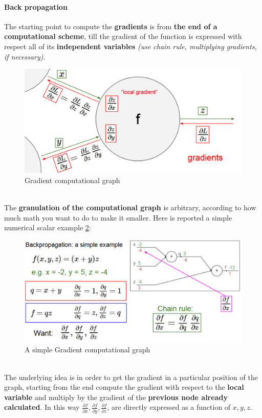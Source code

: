 \documentclass[11pt]{article}
\begin{document}
\paragraph{Back propagation}
The  starting point to compute the \textbf{gradients} is from \textbf{the end of a computational scheme},  till the gradient of the function is expressed with respect  all of its \textbf{independent variables} \textit{(use chain rule, multiplying gradients, if necessary)}.\\
\begin{figure}[h]
\centering
\captionsetup{justification=centering}
\includegraphics[width=0.7\linewidth]{L310.pdf}
\caption{ Gradient computational graph}
\label{fig:L310}
\end{figure}\\
The \textbf{granulation of the computational graph} is arbitrary, according to how much math you want to do to make it smaller. Here is reported a simple numerical scalar  example \ref{fig:L311}:
\begin{figure}[h]
\centering
\captionsetup{justification=centering}
\includegraphics[width=0.7\linewidth]{L311.pdf}
\caption{ A simple Gradient computational graph}
\label{fig:L311}
\end{figure}\\
The underlying idea is in order to get the gradient in a particular position of the graph, starting from the end compute the gradient with respect to the \textbf{local variable} and multiply by the gradient of the \textbf{previous node already calculated}. In this way    $\frac{\partial f}{\partial x},\frac{\partial f}{\partial y},\frac{\partial f}{\partial z}$, are directly expressed as a function of $x,y,z$.
\end{document}

